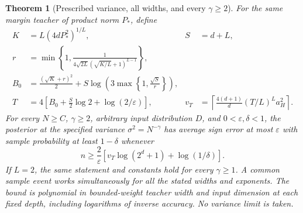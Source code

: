 \documentclass[11pt]{article}
\newtheorem{theorem}{Theorem}[section]
\theoremstyle{remark}\newtheorem{remark}[theorem]{Remark}
\begin{document}
\begin{theorem}[Prescribed variance, all widths, and every $\gamma\ge2$]
\label{thm:finite}
For the same margin teacher of product norm $P_*$, define
\begin{align*}
 K&=L(4dP_*^2)^{1/L}, & S&=d+L,\\
 r&=\min\left\{1,\frac1{4\sqrt{2L}(\sqrt{K/L}+1)^{L-1}}\right\},\\
 B_0&=\frac{(\sqrt K+r)^2}{2}
       +S\log\left(3\max\left\{1,\frac{\sqrt S}{r}\right\}\right),\\
 T&=4\left[B_0+\frac S2\log2+\log(2/\varepsilon)\right], &
 v_T&=\left\lceil\frac{4(d+1)}d(T/L)^L a_H^2\right\rceil.
\end{align*}
For every $N\ge C$, $\gamma\ge2$, arbitrary input distribution $D$, and $0<\varepsilon,\delta<1$, the posterior at the specified variance $\sigma^2=N^{-\gamma}$ has average sign error at most $\varepsilon$ with sample probability at least $1-\delta$ whenever
\[
 n\ge\frac2\varepsilon\left[v_T\log(2^d+1)+\log(1/\delta)\right].
\]
If $L=2$, the same statement and constants hold for every $\gamma\ge1$. A common sample event works simultaneously for all the stated widths and exponents. The bound is polynomial in bounded-weight teacher width and input dimension at each fixed depth, including logarithms of inverse accuracy. No variance limit is taken.
\end{theorem}
\end{document}
